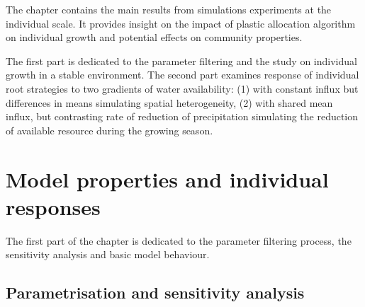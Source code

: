 
\begin{fullwidth}
The chapter contains the main results from simulations experiments at the individual scale. It provides insight on the impact of plastic allocation algorithm on individual growth and potential effects on community properties. 

The first part is dedicated to the parameter filtering and the study on individual growth in a stable environment. The second part examines response of individual root strategies to two gradients of water availability: (1) with constant influx but differences in means simulating spatial heterogeneity, (2) with shared mean influx, but contrasting rate of reduction of precipitation simulating the reduction of available resource during the growing season.
\end{fullwidth}

\chapter{Model properties and individual responses}


The first part of the chapter is dedicated to the parameter filtering process, the sensitivity analysis and basic model behaviour. %


\section{Parametrisation and sensitivity analysis} \label{section:calibration}

